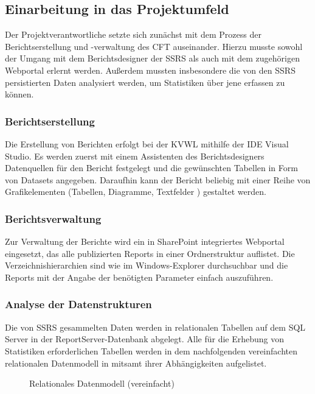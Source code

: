 \subsection{Einarbeitung in das Projektumfeld}
\label{sec:Einarbeitung}
Der Projektverantwortliche \autorName\xspace setzte sich zunächst mit dem Prozess der Berichts\-erstellung und -verwaltung des \ac{CFT} \teamName auseinander. Hierzu musste sowohl der Umgang mit dem Berichtsdesigner der \ac{SSRS} als auch mit dem zugehörigen Webportal erlernt werden. Außerdem mussten insbesondere die von den \ac{SSRS} persistierten Daten analysiert werden, um Statistiken über jene erfassen zu können.

\subsubsection{Berichtserstellung}
\label{sec:Berichtserstellung}
Die Erstellung von Berichten erfolgt bei der \ac{KVWL} mithilfe der \ac{IDE} Visual Studio. Es werden zuerst mit einem Assistenten des Berichtsdesigners Datenquellen für den Bericht festgelegt und die gewünschten Tabellen in Form von Datasets angegeben. Daraufhin kann der Bericht beliebig mit einer Reihe von Grafikelementen (Tabellen, Diagramme, Textfelder \etc) gestaltet werden.

\subsubsection{Berichtsverwaltung}
\label{sec:Berichtsverwaltung}
Zur Verwaltung der Berichte wird ein in SharePoint integriertes Webportal eingesetzt, das alle publizierten Reports in einer Ordnerstruktur auflistet. Die Verzeichnishierarchien sind wie im Windows-Explorer durchsuchbar und die Reports mit der Angabe der benötigten Parameter einfach auszuführen.

\subsubsection{Analyse der Datenstrukturen}
\label{sec:Datenstrukturen}
Die von \ac{SSRS} gesammelten Daten werden in relationalen Tabellen auf dem SQL Server in der ReportServer-Datenbank abgelegt. Alle für die Erhebung von Statistiken erforderlichen Tabellen werden in dem nachfolgenden vereinfachten relationalen Datenmodell in  mitsamt ihrer Abhängigkeiten aufgelistet.
\begin{figure}[htb]
	\centering
	\caption{Relationales Datenmodell (vereinfacht)}
	\label{fig:Datenmodell}
\end{figure}

